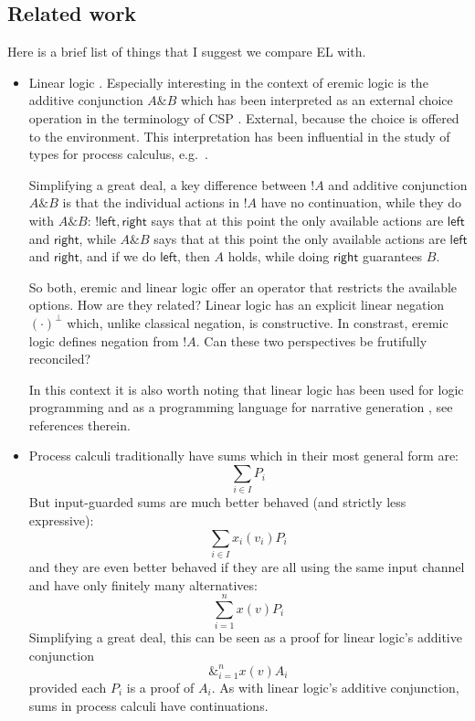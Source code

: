 \subsection{Related work}

Here is a brief list of things that I suggest we compare EL with.

\begin{itemize}

\item Linear logic \cite{GirardJY:linlog,GirardJY:protyp}. Especially
  interesting in the context of eremic logic is the additive
  conjunction $A \& B$ which has been interpreted
  \cite{AbramskyS:comintoll} as an external choice operation in the
  terminology of CSP \cite{HoareC:comseq}. External, because the
  choice is offered to the environment. This interpretation has been
  influential in the study of types for process calculus,
  e.g.~\cite{HondaK:unitypsfsifLONG,TakeuchiK:intbaslaits,HondaK:lanpriatdfscbp}. 

  Simplifying a great deal, a key difference between $!A$ and additive
  conjunction $A \& B$ is that the individual actions in $!A$ have no
  continuation, while they do with $A \& B$: $!{\mathsf{left},
    \mathsf{right}}$ says that at this point the only available
  actions are $\mathsf{left}$ and $\mathsf{right}$, while $A \& B$
  says that at this point the only available actions are
  $\mathsf{left}$ and $\mathsf{right}$, and if we do $\mathsf{left}$,
  then $A$ holds, while doing $\mathsf{right}$ guarantees $B$.

  So both, eremic and linear logic offer an operator that restricts
  the available options. How are they related? Linear logic has an
  explicit linear negation $(\cdot)^{\bot}$ which, unlike classical
  negation, is constructive. In constrast, eremic logic defines
  negation from $!A$. Can these two perspectives be frutifully
  reconciled?

  In this context it is also worth noting that linear logic has been
  used for logic programming
  \cite{HodasJS:logproiafoill,WinikoffMD:logprowll,PymDJ:uniprotiollp,HarlandJ:prolygao,MillerD:surlinlp}
  and as a programming language for narrative generation
  \cite{BosserAG:linlogpfng}, see references therein.


\item Process calculi traditionally 
  have sums which in their most general form are:
  \[
     \sum_{i \in I} P_i
  \]
  But input-guarded sums are much better behaved (and strictly less
  expressive):
  \[
     \sum_{i \in I} x_{i}(v_i)P_i
  \]
  and they are even better behaved if they are all using the same
  input channel and have only finitely many alternatives:
  \[
     \sum_{i = 1}^n x(v)P_i
  \]
  Simplifying a great deal, this can be seen as a proof for linear
  logic's additive conjunction
  \[
     \&_{i = 1}^n x(v)A_i
  \]
  provided each $P_i$ is a proof of $A_i$.  As with linear logic's
  additive conjunction, sums in process calculi have continuations.

\end{itemize}
